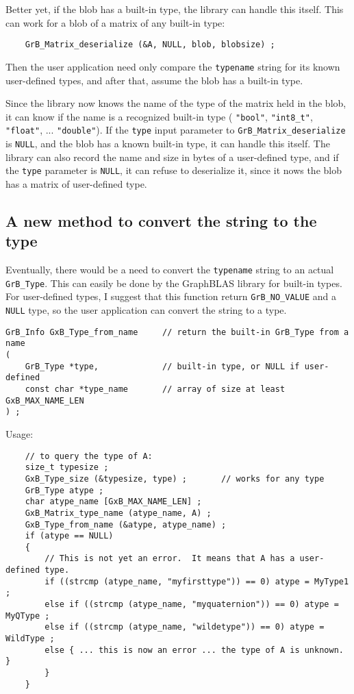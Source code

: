 \documentclass[12pt]{article}
\begin{document}
Better yet, if the blob has a built-in type, the library can handle this
itself.  This can work for a blob of a matrix of any built-in type:

{\footnotesize
\begin{verbatim}
    GrB_Matrix_deserialize (&A, NULL, blob, blobsize) ;
\end{verbatim}}

Then the user application need only compare the \verb'typename' string
for its known user-defined types, and after that, assume the blob has
a built-in type.

Since the library now knows the name of the type of the matrix held in the
blob, it can know if the name is a recognized built-in type (
\verb'"bool"',
\verb'"int8_t"',
\verb'"float"', ...
\verb'"double"').  If the \verb'type' input parameter to \newline
\verb'GrB_Matrix_deserialize' is \verb'NULL', and the blob has a known
built-in type, it can handle this itself.  The library can also record the
name and size in bytes of a user-defined type, and if the \verb'type'
parameter is \verb'NULL', it can refuse to deserialize it, since it nows
the blob has a matrix of user-defined type.

\subsection{A new method to convert the string to the type}

Eventually, there would be a need to convert the \verb'typename' string
to an actual \verb'GrB_Type'.  This can easily be done by the GraphBLAS
library for built-in types.  For user-defined types, I suggest that this
function return \verb'GrB_NO_VALUE' and a \verb'NULL' type, so the user
application can convert the string to a type.

{\footnotesize
\begin{verbatim}
GrB_Info GxB_Type_from_name     // return the built-in GrB_Type from a name
(
    GrB_Type *type,             // built-in type, or NULL if user-defined
    const char *type_name       // array of size at least GxB_MAX_NAME_LEN
) ;
\end{verbatim}}

Usage:

{\footnotesize
\begin{verbatim}
    // to query the type of A:
    size_t typesize ;
    GxB_Type_size (&typesize, type) ;       // works for any type
    GrB_Type atype ;
    char atype_name [GxB_MAX_NAME_LEN] ;
    GxB_Matrix_type_name (atype_name, A) ;
    GxB_Type_from_name (&atype, atype_name) ;
    if (atype == NULL)
    {
        // This is not yet an error.  It means that A has a user-defined type.
        if ((strcmp (atype_name, "myfirsttype")) == 0) atype = MyType1 ;
        else if ((strcmp (atype_name, "myquaternion")) == 0) atype = MyQType ;
        else if ((strcmp (atype_name, "wildetype")) == 0) atype = WildType ;
        else { ... this is now an error ... the type of A is unknown.  }
        }
    }
\end{verbatim}}
\end{document}
